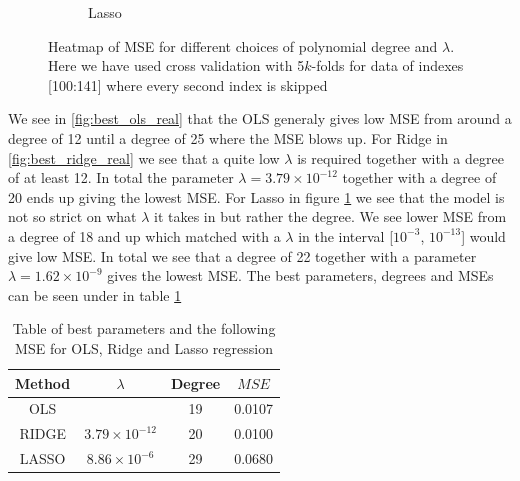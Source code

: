\documentclass[12pt]{article}
\begin{document}
\begin{figure}
\begin{subfigure}{.5\textwidth}
    \caption{Lasso}
    \label{fig:best_lasso_real}
  \end{subfigure}
  \caption{Heatmap of MSE for different choices of polynomial degree and $\lambda$. Here we have used cross validation with 5$k$-folds for data of indexes [100:141] where every second index is skipped}
  \label{fig:heat_real}
\end{figure}
We see in \ref{fig:best_ols_real} that the OLS generaly gives low MSE from around a degree of 12 until a degree of 25 where the MSE blows up. For Ridge in \ref{fig:best_ridge_real} we see that a quite low $\lambda$ is required together with a degree of at least 12. In total the parameter $\lambda =3.79 \times 10^{-12}$ together with a degree of 20 ends up giving the lowest MSE. For Lasso in figure \ref{fig:best_lasso_real} we see that the model is not so strict on what $\lambda$ it takes in but rather the degree. We see lower MSE from a degree of 18 and up which matched with a $\lambda$ in the interval [$10^{-3}$, $10^{-13}$] would give low MSE. In total we see that a degree of 22 together with a parameter $\lambda=1.62\times10^{-9}$ gives the lowest MSE. The best parameters, degrees and MSEs can be seen under in table \ref{tab:best_comp_real}
\begin{table}[H]
  \centering
  \caption{Table of best parameters and the following MSE for OLS, Ridge and Lasso regression}
  \label{tab:best_comp_real}
  \begin{tabular}{|c||c|c|c|}
    \hline
    Method & $\lambda$ & Degree & $MSE$ \\
    \hline
    OLS &  & 19 & 0.0107 \\
    \hline
    RIDGE & $3.79\times10^{-12}$ & 20 & 0.0100 \\
    \hline
    LASSO & $8.86\times10^{-6}$ & 29 & 0.0680 \\
    \hline
  \end{tabular}
\end{table}
\end{document}
